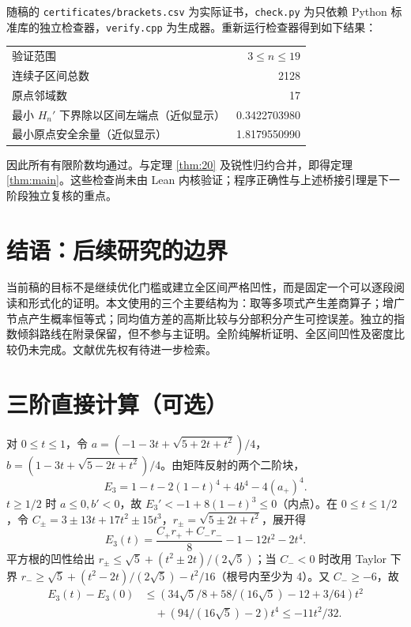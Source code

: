 \documentclass[11pt,a4paper,fontset=fandol]{ctexart}
\begin{document}
随稿的 \texttt{certificates/brackets.csv} 为实际证书，\texttt{check.py} 为只依赖 Python 标准库的独立检查器，\texttt{verify.cpp} 为生成器。重新运行检查器得到如下结果：
\begin{center}\begin{tabular}{lr}\toprule
验证范围 & $3\le n\le19$\\
连续子区间总数 & 2128\\
原点邻域数 & 17\\
最小 $H_n'$ 下界除以区间左端点（近似显示） & 0.3422703980\\
最小原点安全余量（近似显示） & 1.8179550990\\\bottomrule\end{tabular}\end{center}
因此所有有限阶数均通过。与定理 \ref{thm:20} 及锐性归约合并，即得定理 \ref{thm:main}。这些检查尚未由 Lean 内核验证；程序正确性与上述桥接引理是下一阶段独立复核的重点。
\section{结语：后续研究的边界}
当前稿的目标不是继续优化门槛或建立全区间严格凹性，而是固定一个可以逐段阅读和形式化的证明。本文使用的三个主要结构为：取等多项式产生差商算子；增广节点产生概率恒等式；同均值方差的高斯比较与分部积分产生可控误差。独立的指数倾斜路线在附录保留，但不参与主证明。全阶纯解析证明、全区间凹性及密度比较仍未完成。文献优先权有待进一步检索。
\appendix
\section{三阶直接计算（可选）}
对 $0\le t\le1$，令 $a=(-1-3t+\sqrt{5+2t+t^2})/4$，$b=(1-3t+\sqrt{5-2t+t^2})/4$。由矩阵反射的两个二阶块，
\[E_3=1-t-2(1-t)^4+4b^4-4(a_+)^4.\]
$t\ge1/2$ 时 $a\le0,b'<0$，故 $E_3'<-1+8(1-t)^3\le0$（内点）。在 $0\le t\le1/2$，令 $C_\pm=3\pm13t+17t^2\pm15t^3$，$r_\pm=\sqrt{5\pm2t+t^2}$，展开得
\[E_3(t)=\frac{C_+r_++C_-r_-}8-1-12t^2-2t^4.\]
平方根的凹性给出 $r_\pm\le\sqrt5+(t^2\pm2t)/(2\sqrt5)$；当 $C_-<0$ 时改用 Taylor 下界 $r_-\ge\sqrt5+(t^2-2t)/(2\sqrt5)-t^2/16$（根号内至少为 4）。又 $C_-\ge-6$，故
\begin{align*}
E_3(t)-E_3(0)&\le(34\sqrt5/8+58/(16\sqrt5)-12+3/64)t^2\\
 &\quad +(94/(16\sqrt5)-2)t^4\le-11t^2/32.
\end{align*}
\end{document}

